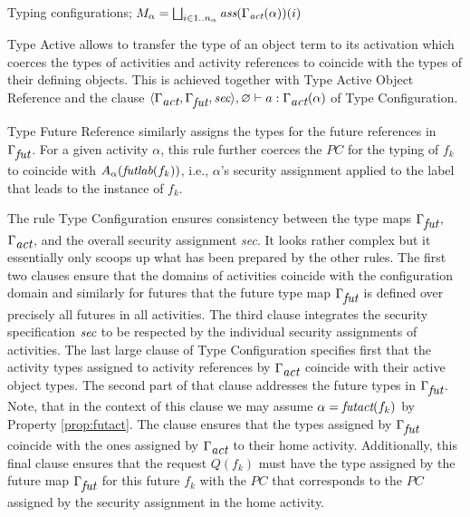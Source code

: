 \documentclass[10pt, conference, compsocconf]{IEEEtran}
\newcommand{\symb}[1]{\makebox{\it #1}}
\begin{document}
{\begin{table*}[ht]
\begin{mathpar}
\end{mathpar}
\vspace{-2ex}
 \caption{Typing configurations; $M_\alpha = \bigsqcup_{i \in 1..n_{\alpha}} {\text{\it ass}}(\Gamma_{\text{\it act}}(\alpha))(i)$}
  \label{tab:typeconf}
\vspace{-3ex}
\end{table*}

{\sc Type Active} allows to transfer the type of an object term to its activation which
coerces the types of activities and activity references to coincide with the types
of their defining objects. This is achieved together with {\sc Type Active Object Reference} and the clause 
$\langle \Gamma_{\symb{act}}, \Gamma_{\symb{fut}}, \symb{sec}\rangle, \varnothing \vdash a: \Gamma_{\symb{act}}(\alpha)$
of {\sc Type Configuration}.

{\sc Type Future Reference} similarly assigns the types for the future references in $\Gamma_{\symb{fut}}$.
For a given activity $\alpha$,
this rule further coerces the $PC$ for the typing of $f_k$ to coincide with $A_{\alpha}(\symb{futlab}(f_k))$, 
i.e., $\alpha$'s security assignment applied to the label that leads to the instance of $f_k$.

The rule {\sc Type Configuration} ensures consistency between the type maps $\Gamma_{\symb{fut}}$,
$\Gamma_{\symb{act}}$, and the overall security assignment {\it sec}.
It looks rather complex but it essentially only scoops up what has been prepared by
the other rules. The first two clauses ensure that the domains of activities coincide 
with the configuration domain and similarly for futures that the future type map 
$\Gamma_{\symb{fut}}$ is defined over precisely all futures
in all activities.  The third clause integrates the security specification 
$\symb{sec}$ to be respected by the individual security assignments of activities. 
The last large clause of {\sc Type Configuration} specifies first that the activity types assigned 
to activity references by $\Gamma_{\symb{act}}$ coincide with their active object types.
The second part of that clause addresses the future types in $\Gamma_{\symb{fut}}$. 
Note, that in the context of this clause we may assume 
$\alpha = \symb{futact}(f_k)$ by Property \ref{prop:futact}.
The clause ensures that the types assigned by $\Gamma_{\symb{fut}}$ coincide with the
ones assigned by $\Gamma_{\symb{act}}$ to their home activity.
Additionally, this final clause ensures that the request $Q(f_k)$ must have the type
assigned by the future map $\Gamma_{\symb{fut}}$ for this future $f_k$ with the $PC$ that
corresponds to the $PC$ assigned by the security assignment in the home activity.

}
\end{document}
